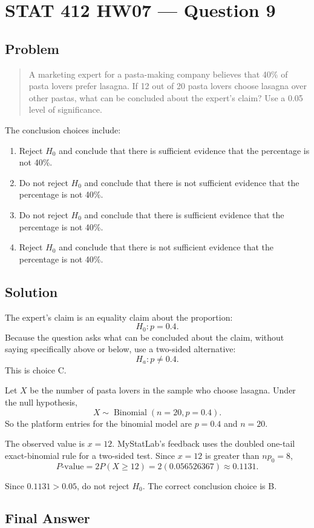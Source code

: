 \documentclass[11pt]{article}
\begin{document}
\section*{STAT 412 HW07 --- Question 9}

\subsection*{Problem}

\begin{quote}
A marketing expert for a pasta-making company believes that 40\% of pasta lovers prefer lasagna. If 12 out of 20 pasta lovers choose lasagna over other pastas, what can be concluded about the expert's claim? Use a 0.05 level of significance.
\end{quote}

The conclusion choices include:
\begin{enumerate}
\item[A.] Reject $H_0$ and conclude that there is sufficient evidence that the percentage is not 40\%.
\item[B.] Do not reject $H_0$ and conclude that there is not sufficient evidence that the percentage is not 40\%.
\item[C.] Do not reject $H_0$ and conclude that there is sufficient evidence that the percentage is not 40\%.
\item[D.] Reject $H_0$ and conclude that there is not sufficient evidence that the percentage is not 40\%.
\end{enumerate}

\subsection*{Solution}

The expert's claim is an equality claim about the proportion:
\[
H_0:p=0.4.
\]
Because the question asks what can be concluded about the claim, without saying specifically above or below, use a two-sided alternative:
\[
H_a:p\ne0.4.
\]
This is choice C.

Let $X$ be the number of pasta lovers in the sample who choose lasagna. Under the null hypothesis,
\[
X\sim\operatorname{Binomial}(n=20,p=0.4).
\]
So the platform entries for the binomial model are $p=0.4$ and $n=20$.

The observed value is $x=12$. MyStatLab's feedback uses the doubled one-tail exact-binomial rule for a two-sided test. Since $x=12$ is greater than $np_0=8$,
\[
P\text{-value}=2P(X\ge12)
=2(0.056526367)
\approx 0.1131.
\]

Since $0.1131>0.05$, do not reject $H_0$. The correct conclusion choice is B.

\subsection*{Final Answer}

\end{document}
